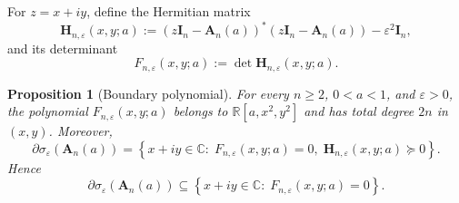 \documentclass[11pt]{article}
\newtheorem{proposition}[theorem]{Proposition}
\newcommand{\R}{\mathbb{R}}
\newcommand{\C}{\mathbb{C}}
\begin{document}
For \(z=x+iy\), define the Hermitian matrix
\[
\mathbf H_{n,\varepsilon}(x,y;a)
:=
(z\mathbf I_n-\mathbf A_n(a))^*(z\mathbf I_n-\mathbf A_n(a))
-\varepsilon^2\mathbf I_n,
\]
and its determinant
\[
F_{n,\varepsilon}(x,y;a)
:=
\det \mathbf H_{n,\varepsilon}(x,y;a).
\]

\begin{proposition}[Boundary polynomial]\label{prop:boundary-polynomial}
For every \(n\ge 2\), \(0<a<1\), and \(\varepsilon>0\), the polynomial \(F_{n,\varepsilon}(x,y;a)\) belongs to \(\R[a,x^2,y^2]\) and has total degree \(2n\) in \((x,y)\). Moreover,
\[
\partial \sigma_\varepsilon(\mathbf A_n(a))
=
\left\{
x+iy\in\C:\;
F_{n,\varepsilon}(x,y;a)=0,\;
\mathbf H_{n,\varepsilon}(x,y;a)\succeq 0
\right\}.
\]
Hence
\[
\partial \sigma_\varepsilon(\mathbf A_n(a))
\subseteq
\left\{
x+iy\in\C:\;
F_{n,\varepsilon}(x,y;a)=0
\right\}.
\]
\end{proposition}
\end{document}
